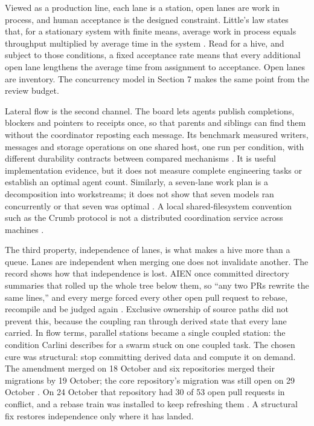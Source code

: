 \documentclass[11pt]{article}
\begin{document}
Viewed as a production line, each lane is a station, open lanes are work in process, and human acceptance is the designed constraint. Little's law states that, for a stationary system with finite means, average work in process equals throughput multiplied by average time in the system \cite{little1961}. Read for a hive, and subject to those conditions, a fixed acceptance rate means that every additional open lane lengthens the average time from assignment to acceptance. Open lanes are inventory. The concurrency model in Section 7 makes the same point from the review budget.

Lateral flow is the second channel. The board lets agents publish completions, blockers and pointers to receipts once, so that parents and siblings can find them without the coordinator reposting each message. Its benchmark measured writers, messages and storage operations on one shared host, one run per condition, with different durability contracts between compared mechanisms \cite{board,synresults}. It is useful implementation evidence, but it does not measure complete engineering tasks or establish an optimal agent count. Similarly, a seven-lane work plan is a decomposition into workstreams; it does not show that seven models ran concurrently or that seven was optimal \cite{workplan}. A local shared-filesystem convention such as the Crumb protocol is not a distributed coordination service across machines \cite{crumb}.

The third property, independence of lanes, is what makes a hive more than a queue. Lanes are independent when merging one does not invalidate another. The record shows how that independence is lost. AIEN once committed directory summaries that rolled up the whole tree below them, so ``any two PRs rewrite the same lines,'' and every merge forced every other open pull request to rebase, recompile and be judged again \cite{oprecord}. Exclusive ownership of source paths did not prevent this, because the coupling ran through derived state that every lane carried. In flow terms, parallel stations became a single coupled station: the condition Carlini describes for a swarm stuck on one coupled task. The chosen cure was structural: stop committing derived data and compute it on demand. The amendment merged on 18 October and six repositories merged their migrations by 19 October; the core repository's migration was still open on 29 October \cite{crumbam1}. On 24 October that repository had 30 of 53 open pull requests in conflict, and a rebase train was installed to keep refreshing them \cite{oprecord}. A structural fix restores independence only where it has landed.
\end{document}
